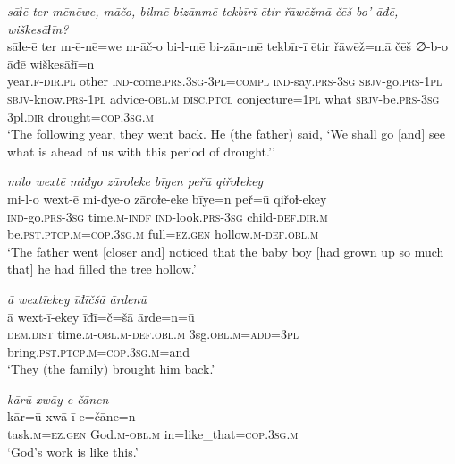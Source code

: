 \ea \label{ZB.46}
\textit{sāɫē ter mēnēwe, māčo, bilmē bizānmē tekbīrī ētir řāwēžmā čēš bo’ āđē, wiškesāɫīn?} \\ 
\gll sāɫe-ē ter m-ē-nē=we m-āč-o bi-l-mē bi-zān-mē tekbīr-ī ētir řāwēž=mā čēš ∅-b-o āđē wiškesāɫī=n \\ 
 year\textsc{.f}\textsc{-dir}\textsc{.pl} other \textsc{ind-}come\textsc{.prs}\textsc{.3sg}\textsc{-3pl}\textsc{=compl} \textsc{ind-}say\textsc{.prs}\textsc{-3sg} \textsc{sbjv-}go\textsc{.prs}\textsc{-1pl} \textsc{sbjv-}know\textsc{.prs}\textsc{-1pl} advice\textsc{-obl}\textsc{.m} \textsc{disc.ptcl} conjecture\textsc{=1pl} what \textsc{sbjv-}be\textsc{.prs}\textsc{-3sg} 3pl\textsc{.dir} drought\textsc{=cop}\textsc{.3sg}\textsc{.m} \\ 
\glt `The following year, they went back. He (the father) said, ‘We shall go [and] see what is ahead of us with this period of drought.’'
\z 
 
\ea \label{ZB.49}
\textit{milo wextē miđyo zāroleke bīyen peřū qiřoɫekey} \\ 
\gll mi-l-o wext-ē mi-đye-o zāroɫe-eke bīye=n peř=ū qiřoɫ-ekey \\ 
 \textsc{ind-}go\textsc{.prs}\textsc{-3sg} time\textsc{.m}\textsc{-indf} \textsc{ind-}look\textsc{.prs}\textsc{-3sg} child\textsc{-def}\textsc{.dir}\textsc{.m} be\textsc{.pst}\textsc{.ptcp}\textsc{.m}\textsc{=cop}\textsc{.3sg}\textsc{.m} full\textsc{\textsc{=ez.gen}} hollow\textsc{.m}\textsc{-def}\textsc{.obl}\textsc{.m} \\ 
\glt `The father went [closer and] noticed that the baby boy [had grown up so much that] he had filled the tree hollow.'
\z 
 
\ea \label{ZB.50}
\textit{ā wextīekey īđīčšā ārdenū} \\ 
\gll ā wext-ī-ekey īđī=č=šā ārde=n=ū \\ 
 \textsc{dem.dist} time\textsc{.m}\textsc{-obl}\textsc{.m}\textsc{-def}\textsc{.obl}\textsc{.m} 3sg\textsc{.obl}\textsc{.m}\textsc{=add}\textsc{=3pl} bring\textsc{.pst}\textsc{.ptcp}\textsc{.m}\textsc{=cop}\textsc{.3sg}\textsc{.m}=and \\ 
\glt `They (the family) brought him back.'
\z 
 
\ea \label{ZB.53}
\textit{kārū xwāy e čānen} \\ 
\gll kār=ū xwā-ī e=čāne=n \\ 
 task\textsc{.m}\textsc{\textsc{=ez.gen}} God\textsc{.m}\textsc{-obl}\textsc{.m} in=like\_that\textsc{=cop}\textsc{.3sg}\textsc{.m} \\ 
\glt `God’s work is like this.'
\z 
 
